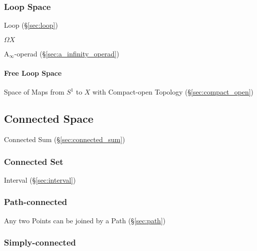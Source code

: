 \subsubsection{Loop Space}\label{sec:loop_space}

Loop (\S\ref{sec:loop})

$\Omega X$

A$_\infty$-operad (\S\ref{sec:a_infinity_operad})



\paragraph{Free Loop Space}\label{sec:free_loop_space}\hfill

Space of Maps from $S^1$ to $X$ with Compact-open Topology
(\S\ref{sec:compact_open})



\subsection{Connected Space}\label{sec:connected_space}

\fist Connected Sum (\S\ref{sec:connected_sum})



\subsubsection{Connected Set}\label{sec:connected_set}

Interval (\S\ref{sec:interval})



\subsubsection{Path-connected}\label{sec:path_connected}

Any two Points can be joined by a Path (\S\ref{sec:path})



\subsubsection{Simply-connected}\label{sec:simply_connected}



